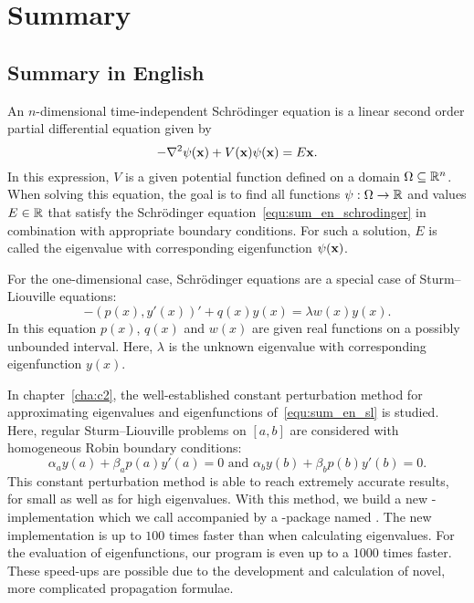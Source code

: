


\chapter*{Summary}


\section*{Summary in English}

An $n$-dimensional time-independent Schrödinger equation is a linear second order partial differential equation given by
\begin{equation}\label{equ:sum_en_schrodinger}
-\nabla^2 \psi(\vb{x}) + V(\vb{x}) \psi(\vb{x}) = E\vb{x}\text{.}
\end{equation}
In this expression, $V$ is a given potential function defined on a domain $\Omega \subseteq \mathbb{R}^n$. When solving this equation, the goal is to find all functions $\psi : \Omega \to \mathbb{R}$ and values $E \in \mathbb{R}$ that satisfy the Schrödinger equation~\eqref{equ:sum_en_schrodinger} in combination with appropriate boundary conditions. For such a solution, $E$ is called the eigenvalue with corresponding eigenfunction $\psi(\vb{x})$.

For the one-dimensional case, Schrödinger equations are a special case of Sturm--Liouville equations:
\begin{equation}\label{equ:sum_en_sl}
    -(p(x), y'(x))' + q(x) y(x) = \lambda w(x) y(x) \text{.}
\end{equation}
In this equation $p(x)$, $q(x)$ and $w(x)$ are given real functions on a possibly unbounded interval. Here, $\lambda$ is the unknown eigenvalue with corresponding eigenfunction $y(x)$.

In chapter~\ref{cha:c2}, the well-established constant perturbation method for approximating eigenvalues and eigenfunctions of~\eqref{equ:sum_en_sl} is studied. Here, regular Sturm--Liouville problems on $[a, b]$ are considered with homogeneous Robin boundary conditions:
$$
\alpha_a y(a) + \beta_a p(a) y'(a) = 0 \text{ and } \alpha_b y(b) + \beta_b p(b) y'(b) = 0\text{.}
$$
This constant perturbation method is able to reach extremely accurate results, for small as well as for high eigenvalues. With this method, we build a new \cpp{}-implementation which we call  accompanied by a \lpython{}-package named \pyslise{}. The new implementation is up to $100$ times faster than  when calculating eigenvalues. For the evaluation of eigenfunctions, our program is even up to a $1000$ times faster. These speed-ups are possible due to the development and calculation of novel, more complicated propagation formulae.

